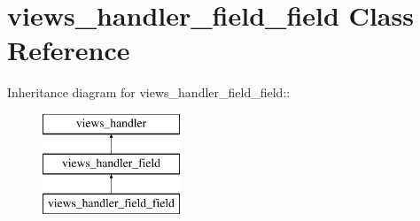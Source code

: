 \hypertarget{classviews__handler__field__field}{
\section{views\_\-handler\_\-field\_\-field Class Reference}
\label{classviews__handler__field__field}
}
Inheritance diagram for views\_\-handler\_\-field\_\-field::\begin{figure}[H]
\begin{center}
\leavevmode
\includegraphics[height=3cm]{classviews__handler__field__field}
\end{center}
\end{figure}
